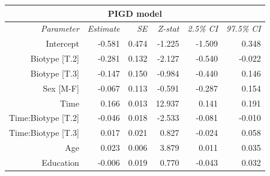 \documentclass[12pt,aps,pra,reprint,showkeys]{revtex4-1}
\begin{document}
\begin{table}[p]
\begin{center}
\begin{tabular}{r r r r r r}
                                                                                                                           \\ \toprule
                                                                                   \multicolumn{6}{c}{\textbf{PIGD model}} \\ \toprule
           \textit{Parameter} & \textit{Estimate} & \textit{SE} & \textit{Z-stat} & \textit{2.5\% CI} & \textit{97.5\% CI} \\ \midrule
                    Intercept &            -0.581 &       0.474 &          -1.225 &            -1.509 &              0.348 \\
                Biotype [T.2] &            -0.281 &       0.132 &          -2.127 &            -0.540 &             -0.022 \\ 
                Biotype [T.3] &            -0.147 &       0.150 &          -0.984 &            -0.440 &              0.146 \\
                    Sex [M-F] &            -0.067 &       0.113 &          -0.591 &            -0.287 &              0.154 \\
                         Time &             0.166 &       0.013 &          12.937 &             0.141 &              0.191 \\
           Time:Biotype [T.2] &            -0.046 &       0.018 &          -2.533 &            -0.081 &             -0.010 \\
           Time:Biotype [T.3] &             0.017 &       0.021 &           0.827 &            -0.024 &              0.058 \\
                          Age &             0.023 &       0.006 &           3.879 &             0.011 &              0.035 \\
                    Education &            -0.006 &       0.019 &           0.770 &            -0.043 &              0.032 \\
      \end{tabular}
    \end{center}
\end{table}
\end{document}
